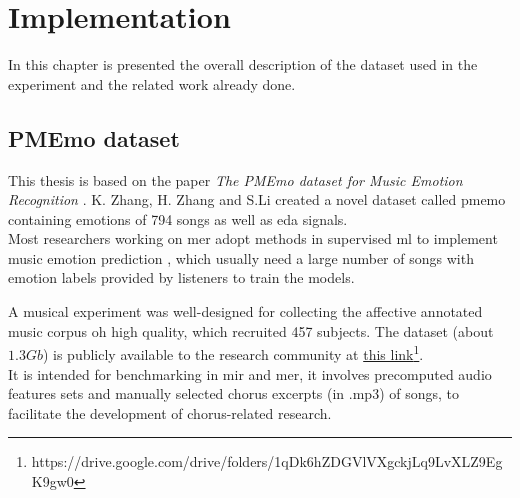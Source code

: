 \chapter{Implementation}
\label{chap:Implementation}
\pagestyle{plain}
\vspace{0.5cm}

\noindent In this chapter is presented the overall description of the dataset used in the experiment and the related work already done.

\section{PMEmo dataset}
This thesis is based on the paper \textit{The PMEmo dataset for Music Emotion Recognition} \cite{zhang2018pmemo}. K. Zhang, H. Zhang and S.Li created a novel dataset called \gls{pmemo} containing emotions of 794 songs as well as \gls{eda} signals.
\\

Most researchers working on \gls{mer} adopt methods in supervised \gls{ml} to implement music emotion prediction \cite{yang2012machine}, which usually need a large number of songs with emotion labels provided by listeners to train the models.

A musical experiment was well-designed for collecting the affective annotated music corpus oh high quality, which recruited 457 subjects.
The dataset (about $1.3Gb$) is publicly available to the research community at \href{https://drive.google.com/drive/folders/1qDk6hZDGVlVXgckjLq9LvXLZ9EgK9gw0}{this link}\footnote{https://drive.google.com/drive/folders/1qDk6hZDGVlVXgckjLq9LvXLZ9EgK9gw0}.
\\
It is intended for benchmarking in \gls{mir} and \gls{mer}, it involves precomputed audio features sets and manually selected chorus excerpts (in .mp3) of songs, to facilitate the development of chorus-related research.

